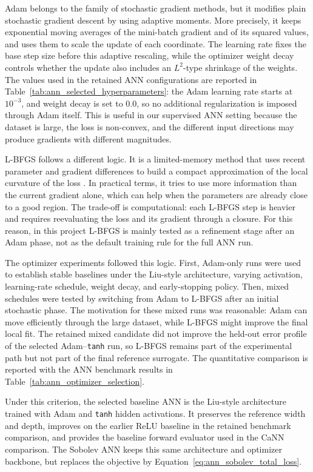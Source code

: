 Adam belongs to the family of stochastic gradient methods, but it modifies plain stochastic gradient descent by using adaptive moments. More precisely, it keeps exponential moving averages of the mini-batch gradient and of its squared values, and uses them to scale the update of each coordinate. The learning rate fixes the base step size before this adaptive rescaling, while the optimizer weight decay controls whether the update also includes an \(L^2\)-type shrinkage of the weights. The values used in the retained ANN configurations are reported in Table~\ref{tab:ann_selected_hyperparameters}: the Adam learning rate starts at \(10^{-3}\), and weight decay is set to \(0.0\), so no additional regularization is imposed through Adam itself. This is useful in our supervised ANN setting because the dataset is large, the loss is non-convex, and the different input directions may produce gradients with different magnitudes.

L-BFGS follows a different logic. It is a limited-memory method that uses recent parameter and gradient differences to build a compact approximation of the local curvature of the loss \cite[Ch.~7]{nocedal2006numerical}. In practical terms, it tries to use more information than the current gradient alone, which can help when the parameters are already close to a good region. The trade-off is computational: each L-BFGS step is heavier and requires reevaluating the loss and its gradient through a closure. For this reason, in this project L-BFGS is mainly tested as a refinement stage after an Adam phase, not as the default training rule for the full ANN run.

The optimizer experiments followed this logic. First, Adam-only runs were used to establish stable baselines under the Liu-style architecture, varying activation, learning-rate schedule, weight decay, and early-stopping policy. Then, mixed schedules were tested by switching from Adam to L-BFGS after an initial stochastic phase. The motivation for these mixed runs was reasonable: Adam can move efficiently through the large dataset, while L-BFGS might improve the final local fit. The retained mixed candidate did not improve the held-out error profile of the selected Adam--\texttt{tanh} run, so L-BFGS remains part of the experimental path but not part of the final reference surrogate. The quantitative comparison is reported with the ANN benchmark results in Table~\ref{tab:ann_optimizer_selection}.

Under this criterion, the selected baseline ANN is the Liu-style architecture trained with Adam and \texttt{tanh} hidden activations. It preserves the reference width and depth, improves on the earlier ReLU baseline in the retained benchmark comparison, and provides the baseline forward evaluator used in the CaNN comparison. The Sobolev ANN keeps this same architecture and optimizer backbone, but replaces the objective by Equation~\eqref{eq:ann_sobolev_total_loss}.

